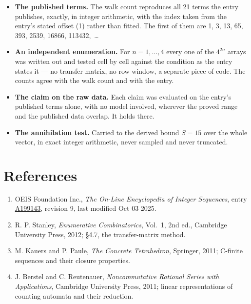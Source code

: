 \documentclass[11pt]{article}
\theoremstyle{definition}
\begin{document}
\begin{itemize}

\item {\bfseries The published terms.} The walk count reproduces all 21 terms the entry publishes, exactly, in integer arithmetic, with the index taken from the entry's stated offset (1) rather than fitted. The first of them are 1, 3, 13, 65, 393, 2539, 16866, 113432,~\dots

\item {\bfseries An independent enumeration.} For $n = 1,\dots,4$ every one of the $4^{2n}$ arrays was written out and tested cell by cell against the condition as the entry states it --- no transfer matrix, no row window, a separate piece of code. The counts agree with the walk count and with the entry.

\item {\bfseries The claim on the raw data.} Each claim was evaluated on the entry's published terms alone, with no model involved, wherever the proved range and the published data overlap. It holds there.

\item {\bfseries The annihilation test.} Carried to the derived bound $S = 15$ over the whole vector, in exact integer arithmetic, never sampled and never truncated.

\end{itemize}

\section{References}

\begin{enumerate}

\item OEIS Foundation Inc., \emph{The On-Line Encyclopedia of Integer Sequences}, entry \href{https://oeis.org/A199143}{A199143}, revision 9, last modified Oct 03 2025.

\item R. P. Stanley, \emph{Enumerative Combinatorics}, Vol.~1, 2nd ed., Cambridge University Press, 2012; \S4.7, the transfer-matrix method.

\item M. Kauers and P. Paule, \emph{The Concrete Tetrahedron}, Springer, 2011; C-finite sequences and their closure properties.

\item J. Berstel and C. Reutenauer, \emph{Noncommutative Rational Series with Applications}, Cambridge University Press, 2011; linear representations of counting automata and their reduction.

\end{enumerate}
\end{document}
